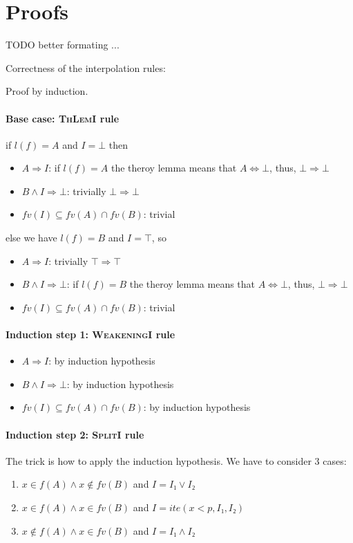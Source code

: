 \section{Proofs}

TODO better formating ...

Correctness of the interpolation rules:

Proof by induction.

\paragraph{Base case: \textsc{ThLemI} rule}
if $l(f)=A$ and $I=⊥$ then
\begin{itemize}
\item $A ⇒ I$: if $l(f)=A$ the theroy lemma means that $A⇔⊥$, thus, $⊥⇒⊥$
\item $B ∧ I ⇒ ⊥$: trivially $⊥⇒⊥$
\item $fv(I) ⊆ fv(A) ∩ fv(B)$: trivial
\end{itemize}

else we have $l(f)=B$ and $I=\top$, so
\begin{itemize}
\item $A ⇒ I$: trivially $\top ⇒ \top$
\item $B ∧ I ⇒ ⊥$:  if $l(f)=B$ the theroy lemma means that $A⇔⊥$, thus, $⊥⇒⊥$
\item $fv(I) ⊆ fv(A) ∩ fv(B)$: trivial
\end{itemize}

\paragraph{Induction step 1: \textsc{WeakeningI} rule}
\begin{itemize}
\item $A ⇒ I$: by induction hypothesis
\item $B ∧ I ⇒ ⊥$: by induction hypothesis
\item $fv(I) ⊆ fv(A) ∩ fv(B)$: by induction hypothesis
\end{itemize}

\paragraph{Induction step 2: \textsc{SplitI} rule}
The trick is how to apply the induction hypothesis.
We have to consider 3 cases:
\begin{enumerate}
\item $x ∈ f(A) ∧ x \notin fv(B)$ and $I = I₁ ∨ I₂$
\item $x ∈ f(A) ∧ x ∈ fv(B)$ and $I = ite(x < p, I₁, I₂)$
\item $x \notin f(A) ∧ x ∈ fv(B)$ and $I = I₁ ∧ I₂$
\end{enumerate}

